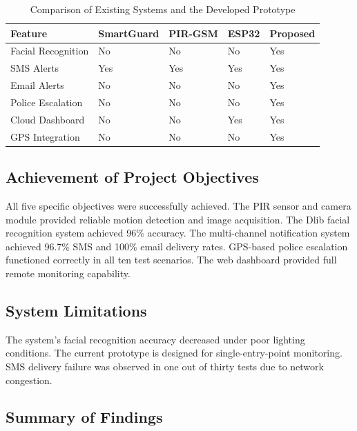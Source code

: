 \documentclass[12pt,a4paper,oneside]{report}
\begin{document}
\begin{table}[htbp]
  \centering
  \caption{Comparison of Existing Systems and the Developed Prototype}
  {\small
  \begin{tabular}{|p{5.00cm}|p{2.50cm}|p{2.50cm}|p{2.50cm}|p{2.50cm}|}
    \hline
    \textbf{Feature} & \textbf{SmartGuard} & \textbf{PIR-GSM} & \textbf{ESP32} & \textbf{Proposed} \\
    \hline
    Facial Recognition    & No    & No    & No    & Yes \\
    SMS Alerts            & Yes   & Yes   & Yes   & Yes \\
    Email Alerts          & No    & No    & No    & Yes \\
    Police Escalation     & No    & No    & No    & Yes \\
    Cloud Dashboard       & No    & No    & Yes   & Yes \\
    GPS Integration       & No    & No    & No    & Yes \\
    \hline
  \end{tabular}
  }
\end{table}

\subsection{Achievement of Project Objectives}

All five specific objectives were successfully achieved. The PIR sensor and camera module provided reliable motion detection and image acquisition. The Dlib facial recognition system achieved 96\% accuracy. The multi-channel notification system achieved 96.7\% SMS and 100\% email delivery rates. GPS-based police escalation functioned correctly in all ten test scenarios. The web dashboard provided full remote monitoring capability.

\subsection{System Limitations}

The system's facial recognition accuracy decreased under poor lighting conditions. The current prototype is designed for single-entry-point monitoring. SMS delivery failure was observed in one out of thirty tests due to network congestion.

\subsection{Summary of Findings}
\end{document}

